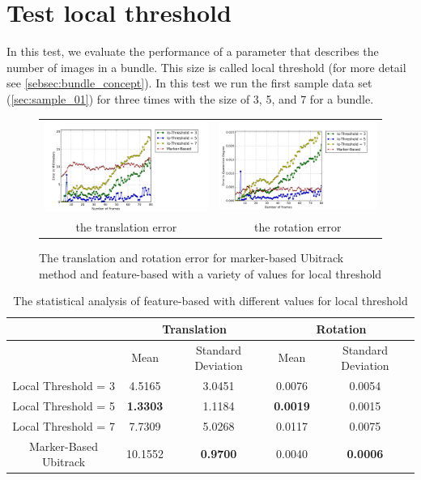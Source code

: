 \section{Test local threshold} \label{sec:local_threshold}
In this test, we evaluate the performance of a parameter that describes the number of images in a bundle. This size is called local threshold (for more detail see \autoref{sebsec:bundle_concept}). In this test we run the first sample data set (\autoref{sec:sample_01}) for three times with the size of 3, 5, and 7 for a bundle.
\begin{figure}[H]
\centering
\begin{tabular}{cc}
  \includegraphics[width=80mm]{figures/local/graph_translation} &   \includegraphics[width=80mm]{figures/local/graph_rotation}  \\
  the translation error & the rotation error \\[6pt]
\end{tabular}
\caption{The translation and rotation error for marker-based Ubitrack method and feature-based with a variety of values for local threshold}\label{fig:test_local_threshold}
\end{figure}

\begin{table}[H]
\centering
  \begin{tabular}{| c || c | c | c | c |}
      \hline
      & \multicolumn{2}{c|}{Translation} & \multicolumn{2}{c|}{Rotation} \\ \hline
       & Mean & Standard Deviation & Mean & Standard Deviation \\ \hline
      Local Threshold = 3 & 4.5165 & 3.0451 & 0.0076 & 0.0054 \\ \hline
      Local Threshold = 5 & \textbf{1.3303} & 1.1184 & \textbf{0.0019} & 0.0015 \\ \hline
      Local Threshold = 7 & 7.7309 & 5.0268 & 0.0117 & 0.0075 \\ \hline
      Marker-Based Ubitrack & 10.1552 & \textbf{0.9700} & 0.0040 & \textbf{0.0006} \\ \hline
  \end{tabular}
  \caption{The statistical analysis of feature-based with different values for local threshold} \label{tab:test_local_threshold}
\end{table}

